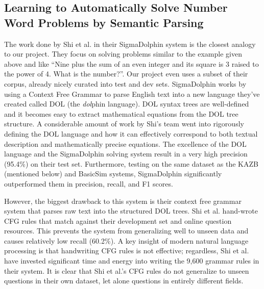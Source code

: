 \documentclass[11pt]{article}
\begin{document}
\subsection{Learning to Automatically Solve Number Word Problems by Semantic Parsing}
The work done by Shi et al.  in their SigmaDolphin system is the closest analogy to our project. They focus on solving problems similar to the example given above and like ``Nine plus the sum of an even integer and its square is 3 raised to the power of 4. What is the number?''. Our project even uses a subset of their corpus, already nicely curated into test and dev sets. SigmaDolphin works by using a Context Free Grammar to parse English text into a new language they've created called DOL (the \textit{dol}phin language). DOL syntax trees are well-defined and it becomes easy to extract mathematical equations from the DOL tree structure. A considerable amount of work by Shi's team went into rigorously defining the DOL language and how it can effectively correspond to both textual description and mathematically precise equations. The excellence of the DOL language and the SigmaDolphin solving system result in a very high precision (95.4\%) on their test set. Furthermore, testing on the same dataset as the KAZB (mentioned below) and BasicSim systems, SigmaDolphin significantly outperformed them in precision, recall, and F1 scores.

However, the biggest drawback to this system is their context free grammar system that parses raw text into the structured DOL trees. Shi et al. hand-wrote CFG rules that match against their development set and online question resources. This prevents the system from generalizing well to unseen data and causes relatively low recall (60.2\%). A key insight of modern natural language processing is that handwriting CFG rules is not effective; regardless, Shi et al. have invested significant time and energy into writing the 9,600 grammar rules in their system. It is clear that Shi et al.'s CFG rules do not generalize to unseen questions in their own dataset, let alone questions in entirely different fields.
\end{document}
